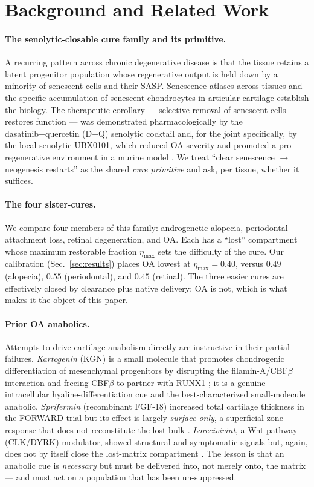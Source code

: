 \documentclass[11pt,a4paper]{article}
\begin{document}
\section{Background and Related Work}

\paragraph{The senolytic-closable cure family and its primitive.}
A recurring pattern across chronic degenerative disease is that the tissue
retains a latent progenitor population whose regenerative output is held down by a
minority of senescent cells and their SASP. Senescence atlases across tissues
\citep{moiseeva2023} and the specific accumulation of senescent chondrocytes in
articular cartilage \citep{loeser2016} establish the biology. The therapeutic
corollary --- selective removal of senescent cells restores function --- was
demonstrated pharmacologically by the dasatinib+quercetin (D+Q) senolytic
cocktail \citep{zhu2015} and, for the joint specifically, by the local senolytic
UBX0101, which reduced OA severity and promoted a pro-regenerative environment in
a murine model \citep{jeon2017}. We treat ``clear senescence $\to$ neogenesis
restarts'' as the shared \emph{cure primitive} and ask, per tissue, whether it
suffices.

\paragraph{The four sister-cures.}
We compare four members of this family: androgenetic alopecia, periodontal
attachment loss, retinal degeneration, and OA. Each has a ``lost'' compartment
whose maximum restorable fraction $\eta_{\max}$ sets the difficulty of the cure.
Our calibration (Sec.~\ref{sec:results}) places OA lowest at $\eta_{\max}=0.40$,
versus $0.49$ (alopecia), $0.55$ (periodontal), and $0.45$ (retinal). The three
easier cures are effectively closed by clearance plus native delivery; OA is not,
which is what makes it the object of this paper.

\paragraph{Prior OA anabolics.}
Attempts to drive cartilage anabolism directly are instructive in their partial
failures. \emph{Kartogenin} (KGN) is a small molecule that promotes chondrogenic
differentiation of mesenchymal progenitors by disrupting the filamin-A/CBF$\beta$
interaction and freeing CBF$\beta$ to partner with RUNX1
\citep{johnson2012}; it is a genuine intracellular hyaline-differentiation cue and
the best-characterized small-molecule anabolic. \emph{Sprifermin} (recombinant
FGF-18) increased total cartilage thickness in the FORWARD trial but its effect
is largely \emph{surface-only}, a superficial-zone response that does not
reconstitute the lost bulk \citep{hochberg2019}. \emph{Lorecivivint}, a
Wnt-pathway (CLK/DYRK) modulator, showed structural and symptomatic signals but,
again, does not by itself close the lost-matrix compartment
\citep{yazici2020}. The lesson is that an anabolic cue is \emph{necessary} but
must be delivered into, not merely onto, the matrix --- and must act on a
population that has been un-suppressed.
\end{document}
